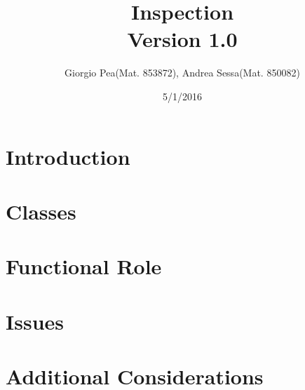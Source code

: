 \documentclass[11pt,titlepage]{article} %
\title{Inspection \\ \vspace{1cm} \large{Version 1.0}}
\author{Giorgio Pea(Mat. 853872), Andrea Sessa(Mat. 850082)}
\date{5/1/2016}
\begin{document}
\maketitle

\newpage

\tableofcontents

\newpage

\section{Introduction}

\section{Classes}

\section{Functional Role}

\section{Issues}

\section{Additional Considerations}
\end{document}
